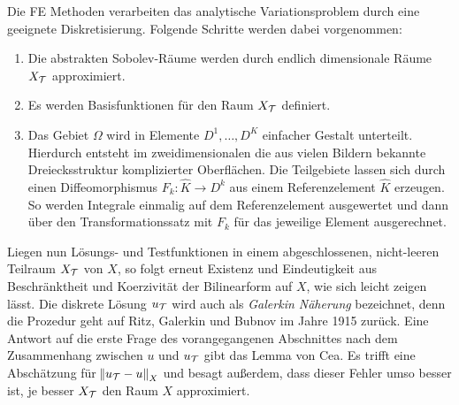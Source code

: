  Die FE Methoden verarbeiten das analytische Variationsproblem durch eine geeignete Diskretisierung. Folgende Schritte werden dabei vorgenommen:
\begin{enumerate}[label=(\roman*)]
  \item Die abstrakten Sobolev-Räume werden durch endlich dimensionale Räume $X_{\mathcal{T}}$ approximiert.
  \item Es werden Basisfunktionen für den Raum $X_{\mathcal{T}}$ definiert.
  \item Das Gebiet $\Omega$ wird in Elemente $D^1,\dots, D^K$ einfacher Gestalt unterteilt. Hierdurch entsteht im zweidimensionalen die aus vielen Bildern bekannte Dreiecksstruktur komplizierter Oberflächen. Die Teilgebiete lassen sich durch einen Diffeomorphismus $F_k: \hat{K}\rightarrow D^k$ aus einem Referenzelement $\hat{K}$ erzeugen. So werden Integrale einmalig auf dem Referenzelement ausgewertet und dann über den Transformationssatz mit $F_k$ für das jeweilige Element ausgerechnet.
\end{enumerate}
Liegen nun Lösungs- und Testfunktionen in einem abgeschlossenen, nicht-leeren Teilraum $X_{\mathcal{T}}$ von $X$, so folgt erneut Existenz und Eindeutigkeit aus Beschränktheit und Koerzivität der Bilinearform auf $X$, wie sich leicht zeigen lässt. %
Die diskrete Lösung $u_{\mathcal{T}}$ wird auch als \emph{Galerkin Näherung} bezeichnet, denn die Prozedur geht auf Ritz, Galerkin und Bubnov im Jahre 1915 zurück. Eine Antwort auf die erste Frage des vorangegangenen Abschnittes nach dem Zusammenhang zwischen $u$ und $u_{\mathcal{T}}$ gibt das Lemma von Cea. Es trifft eine Abschätzung für $\norm{u_{\mathcal{T}}-u}_X$ und besagt außerdem, dass dieser Fehler umso besser ist, je besser $X_{\mathcal{T}}$ den Raum $X$ approximiert.

